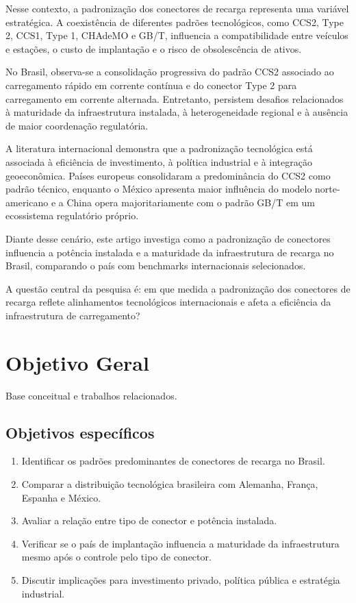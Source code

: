 \documentclass[12pt]{article}
\begin{document}
Nesse contexto, a padronização dos conectores de recarga representa uma variável estratégica. A coexistência de diferentes padrões tecnológicos, como CCS2, Type 2, CCS1, Type 1, CHAdeMO e GB/T, influencia a compatibilidade entre veículos e estações, o custo de implantação e o risco de obsolescência de ativos. 

No Brasil, observa-se a consolidação progressiva do padrão CCS2 associado ao carregamento rápido em corrente contínua e do conector Type 2 para carregamento em corrente alternada. Entretanto, persistem desafios relacionados à maturidade da infraestrutura instalada, à heterogeneidade regional e à ausência de maior coordenação regulatória. 

A literatura internacional demonstra que a padronização tecnológica está associada à eficiência de investimento, à política industrial e à integração geoeconômica. Países europeus consolidaram a predominância do CCS2 como padrão técnico, enquanto o México apresenta maior influência do modelo norte-americano e a China opera majoritariamente com o padrão GB/T em um ecossistema regulatório próprio. 

Diante desse cenário, este artigo investiga como a padronização de conectores influencia a potência instalada e a maturidade da infraestrutura de recarga no Brasil, comparando o país com benchmarks internacionais selecionados. 

A questão central da pesquisa é: em que medida a padronização dos conectores de recarga reflete alinhamentos tecnológicos internacionais e afeta a eficiência da infraestrutura de carregamento?

\section{Objetivo Geral}
Base conceitual e trabalhos relacionados.

\subsection{Objetivos específicos}
\begin{enumerate}
    \item Identificar os padrões predominantes de conectores de recarga no Brasil.
    \item Comparar a distribuição tecnológica brasileira com Alemanha, França, Espanha e México.
    \item Avaliar a relação entre tipo de conector e potência instalada.
    \item Verificar se o país de implantação influencia a maturidade da infraestrutura mesmo após o controle pelo tipo de conector.
    \item Discutir implicações para investimento privado, política pública e estratégia industrial.
\end{enumerate}
\end{document}
